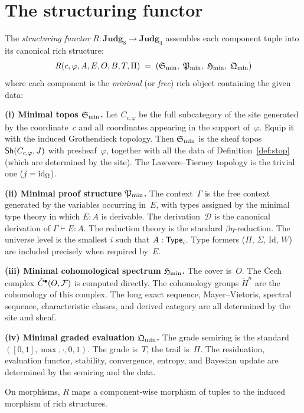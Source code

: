\section{The structuring functor}
\label{sec:enrichment-functor}

\begin{construction}
\label{con:enrichment-functor}
The \emph{structuring functor}
$R : \mathbf{Judg}_8 \to \mathbf{Judg}_4$ assembles each component
tuple into its canonical rich structure:
\[
  R(c, \varphi, A, E, O, B, T, \Pi)
  \;=\;
  (\mathfrak{S}_{\min},\; \mathfrak{P}_{\min},\; \mathfrak{H}_{\min},\; \mathfrak{Q}_{\min})
\]
where each component is the \emph{minimal} (or \emph{free}) rich object
containing the given data:

\medskip
\noindent\textbf{(i) Minimal topos $\mathfrak{S}_{\min}$.}
Let $C_{c,\varphi}$ be the full subcategory of the site generated by
the coordinate~$c$ and all coordinates appearing in the support
of~$\varphi$.  Equip it with the induced Grothendieck topology.  Then
$\mathfrak{S}_{\min}$ is the sheaf topos $\mathsf{Sh}(C_{c,\varphi}, J)$ with
presheaf~$\varphi$, together with all the data of
Definition~\ref{def:stop} (which are determined by the site).
The Lawvere--Tierney topology is the trivial one ($j = \mathrm{id}_\Omega$).

\medskip
\noindent\textbf{(ii) Minimal proof structure $\mathfrak{P}_{\min}$.}
The context~$\Gamma$ is the free context generated by the variables
occurring in~$E$, with types assigned by the minimal type theory in
which $E : A$ is derivable.  The derivation~$\mathcal{D}$ is the
canonical derivation of $\Gamma \vdash E : A$.  The reduction theory
is the standard $\beta\eta$-reduction.  The universe level is the
smallest $i$ such that $A : \mathsf{Type}_i$.  Type formers ($\Pi$, $\Sigma$,
$\mathrm{Id}$, $W$) are included precisely when required by~$E$.

\medskip
\noindent\textbf{(iii) Minimal cohomological spectrum $\mathfrak{H}_{\min}$.}
The cover is~$O$.  The \v{C}ech complex $\check{C}^\bullet(O, \mathcal{F})$
is computed directly.  The cohomology groups $\check{H}^n$ are the
cohomology of this complex.  The long exact sequence, Mayer--Vietoris,
spectral sequence, characteristic classes, and derived category are all
determined by the site and sheaf.

\medskip
\noindent\textbf{(iv) Minimal graded evaluation $\mathfrak{Q}_{\min}$.}
The grade semiring is the standard $([0,1], \max, \cdot, 0, 1)$.
The grade is~$T$, the trail is~$\Pi$.  The residuation, evaluation
functor, stability, convergence, entropy, and Bayesian update are
determined by the semiring and the data.

\medskip
\noindent On morphisms, $R$ maps a component-wise morphism of tuples
to the induced morphism of rich structures.
\end{construction}

